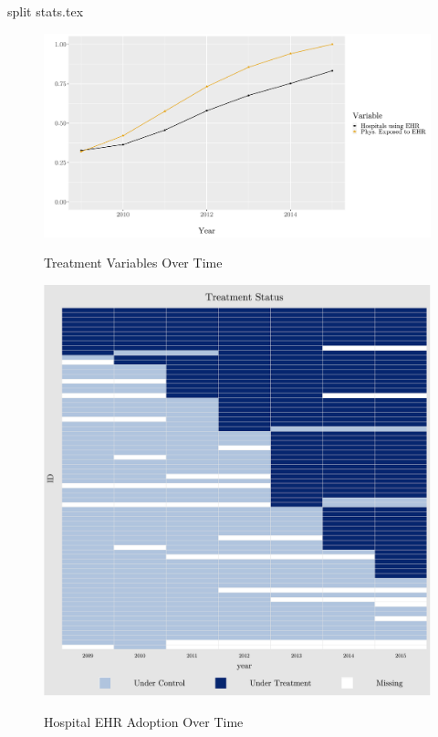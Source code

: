 \documentclass[11pt]{article}
\begin{document}
{split stats.tex}

\begin{figure}[p]
\centering
    \caption{Treatment Variables Over Time}
    \includegraphics[scale=.55]{Objects/sum_stats_year.pdf}
    \label{fig:treatmentgraph}
\end{figure}

\begin{figure}
    \centering
    \caption{Hospital EHR Adoption Over Time}
    \includegraphics[scale=.8]{Objects/hosp_treat.pdf}
    \label{fig:hosp_treat}
\end{figure}
\end{document}
